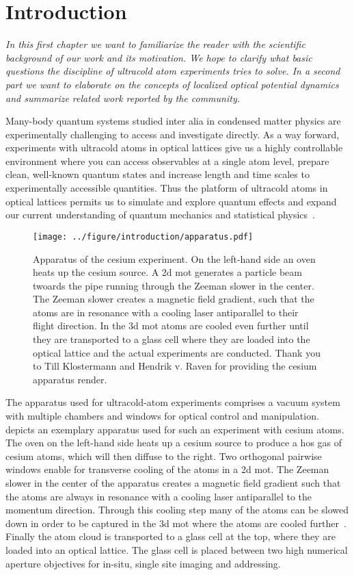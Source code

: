 \chapter{Introduction}

\textit{In this first chapter we want to familiarize the reader with the
scientific background of our work and its motivation. We hope to clarify what
basic questions the discipline of ultracold atom experiments tries to solve.
In a second part we want to elaborate on the concepts of localized optical
potential dynamics and summarize related work reported by the community.}

Many-body quantum systems studied inter alia in condensed matter physics are
experimentally challenging to access and investigate directly. As a way
forward, experiments with ultracold atoms in optical lattices give us a highly
controllable environment where you can access observables at a single atom
level, prepare clean, well-known quantum states and increase length and time
scales to experimentally accessible quantities. Thus the platform of ultracold
atoms in optical lattices permits us to simulate and explore quantum effects
and expand our current understanding of quantum mechanics and statistical
physics~\cite{Bloch2008,Gross2017}.
\begin{figure}[htb]
  \centering
  \texttt{[image: ../figure/introduction/apparatus.pdf]}
  \caption{Apparatus of the cesium experiment. On the left-hand
    side an oven heats up the cesium source. A \gls{2d} \gls{mot} generates a
    particle beam twoards the pipe running through the Zeeman slower in the
    center. The Zeeman slower creates a magnetic field gradient, such that the
    atoms are in resonance with a cooling laser antiparallel to their flight
    direction. In the \gls{3d} \gls{mot} atoms are cooled even further until
    they are transported to a glass cell where they are loaded into the
    optical lattice and the actual experiments are conducted. Thank you to
    Till Klostermann and Hendrik v. Raven for providing the cesium apparatus
    render.}\label{fig:ultracold_atoms_setup}
\end{figure}
The apparatus used for ultracold-atom experiments comprises a vacuum system
with multiple chambers and windows for optical control and manipulation.
 depicts an exemplary apparatus used
for such an experiment with cesium atoms. The oven on the left-hand side heats
up a cesium source to produce a hos gas of cesium atoms, which will then
diffuse to the right. Two orthogonal pairwise windows enable for transverse
cooling of the atoms in a \gls{2d} \gls{mot}. The Zeeman slower in the center
of the apparatus creates a magnetic field gradient such that the atoms are
always in resonance with a cooling laser antiparallel to the momentum
direction. Through this cooling step many of the atoms can be slowed down in
order to be captured in the \gls{3d} \gls{mot} where the atoms are cooled
further~\cite{Phillips1998}. Finally the atom cloud is transported to a glass
cell at the top, where they are loaded into an optical lattice. The glass
cell is placed between two high numerical aperture objectives for in-situ,
single site imaging and addressing.

